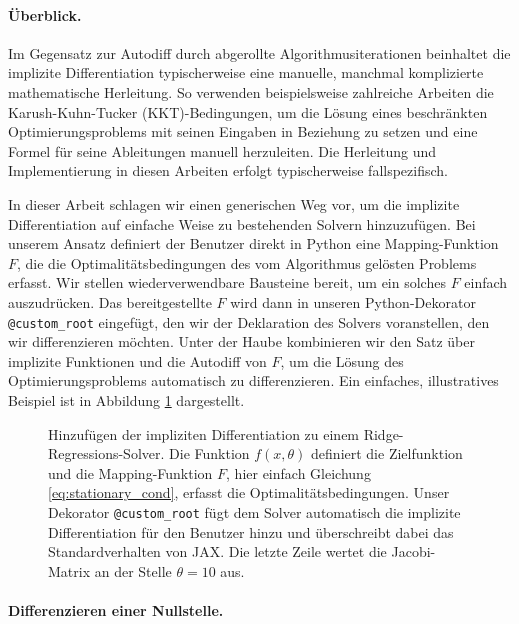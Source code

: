 \paragraph{Überblick.}

Im Gegensatz zur Autodiff durch abgerollte Algorithmusiterationen beinhaltet die implizite Differentiation typischerweise eine manuelle, manchmal komplizierte mathematische Herleitung. So verwenden beispielsweise zahlreiche Arbeiten \cite{chapelle_2002, gould_2016, amos_2017,sparsemap,lp_sparsemap} die Karush-Kuhn-Tucker (KKT)-Bedingungen, um die Lösung eines beschränkten Optimierungsproblems mit seinen Eingaben in Beziehung zu setzen und eine Formel für seine Ableitungen manuell herzuleiten. Die Herleitung und Implementierung in diesen Arbeiten erfolgt typischerweise fallspezifisch.

In dieser Arbeit schlagen wir einen generischen Weg vor, um die implizite Differentiation auf einfache Weise zu bestehenden Solvern hinzuzufügen. Bei unserem Ansatz definiert der Benutzer direkt in Python eine Mapping-Funktion $F$, die die Optimalitätsbedingungen des vom Algorithmus gelösten Problems erfasst. Wir stellen wiederverwendbare Bausteine bereit, um ein solches $F$ einfach auszudrücken. Das bereitgestellte $F$ wird dann in unseren Python-Dekorator \texttt{@custom\_root} eingefügt, den wir der Deklaration des Solvers voranstellen, den wir differenzieren möchten. Unter der Haube kombinieren wir den Satz über implizite Funktionen und die Autodiff von $F$, um die Lösung des Optimierungsproblems automatisch zu differenzieren. Ein einfaches, illustratives Beispiel ist in Abbildung \ref{fig:ridge} dargestellt.

\begin{figure}[t]
\centering
{}
\caption{Hinzufügen der impliziten Differentiation zu einem Ridge-Regressions-Solver. Die Funktion $f(x, \theta)$ definiert die Zielfunktion und die Mapping-Funktion $F$, hier einfach Gleichung \eqref{eq:stationary_cond}, erfasst die Optimalitätsbedingungen. Unser Dekorator \texttt{@custom\_root} fügt dem Solver automatisch die implizite Differentiation für den Benutzer hinzu und überschreibt dabei das Standardverhalten von JAX. Die letzte Zeile wertet die Jacobi-Matrix an der Stelle $\theta = 10$ aus.}
\label{fig:ridge}
\end{figure}

\paragraph{Differenzieren einer Nullstelle.}

